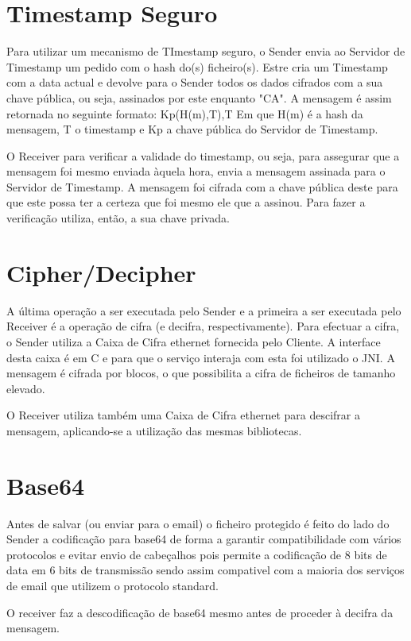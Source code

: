 \section{Timestamp Seguro}
\label{section:timestamp}
Para utilizar um mecanismo de TImestamp seguro, o Sender envia ao Servidor de Timestamp um pedido com o hash do(s) ficheiro(s). Estre cria um Timestamp com a data actual e devolve para o Sender todos os dados cifrados com a sua chave pública, ou seja, assinados por este enquanto "CA".
A mensagem é assim retornada no seguinte formato:
Kp(H(m),T),T
Em que H(m) é a hash da mensagem, T o timestamp e Kp a chave pública do Servidor de Timestamp. 

O Receiver para verificar a validade do timestamp, ou seja, para assegurar que a mensagem foi mesmo enviada àquela hora, envia a mensagem assinada para o Servidor de Timestamp. A mensagem foi cifrada com a chave pública deste para que este possa ter a certeza que foi mesmo ele que a assinou. Para fazer a verificação utiliza, então, a sua chave privada.

\section{Cipher/Decipher}
A última operação a ser executada pelo Sender e a primeira a ser executada pelo Receiver é a operação de cifra (e decifra, respectivamente).
Para efectuar a cifra, o Sender utiliza a Caixa de Cifra ethernet fornecida pelo Cliente. A interface desta caixa é em C e para que o serviço interaja com esta foi utilizado o JNI.
A mensagem é cifrada por blocos, o que possibilita a cifra de ficheiros de tamanho elevado.

O Receiver utiliza também uma Caixa de Cifra ethernet para descifrar a mensagem, aplicando-se a utilização das mesmas bibliotecas.

\section{Base64}
Antes de salvar (ou enviar para o email) o ficheiro protegido é feito do lado do Sender a codificação para base64 de forma a garantir compatibilidade com vários protocolos e evitar envio de cabeçalhos pois permite a codificação de 8 bits de data em 6 bits de transmissão sendo assim compativel com a maioria dos serviços de email que utilizem o protocolo standard.

O receiver faz a descodificação de base64 mesmo antes de proceder à decifra da mensagem.


